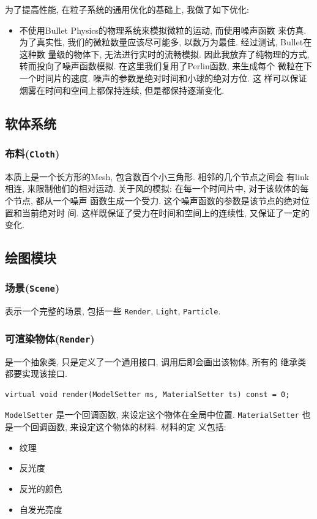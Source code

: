 \documentclass[11pt]{article}
\begin{document}
为了提高性能, 在粒子系统的通用优化的基础上, 我做了如下优化:
\begin{itemize}
\item 不使用Bullet Physics的物理系统来模拟微粒的运动, 而使用噪声函数
来仿真. 为了真实性, 我们的微粒数量应该尽可能多, 以数万为最佳. 经过测试, Bullet在这种数
量级的物体下, 无法进行实时的流畅模拟. 因此我放弃了纯物理的方式,
转而投向了噪声函数模拟. 在这里我们复用了Perlin函数, 来生成每个
微粒在下一个时间片的速度. 噪声的参数是绝对时间和小球的绝对方位. 这
样可以保证烟雾在时间和空间上都保持连续, 但是都保持逐渐变化.
\end{itemize}
\subsection{软体系统}
\label{sec-3-3}
\subsubsection{布料(\texttt{Cloth})}
\label{sec-3-3-1}
本质上是一个长方形的Mesh, 包含数百个小三角形. 相邻的几个节点之间会
有link相连, 来限制他们的相对运动. 
关于风的模拟: 在每一个时间片中, 对于该软体的每个节点, 都从一个噪声
函数生成一个受力. 这个噪声函数的参数是该节点的绝对位置和当前绝对时
间. 这样既保证了受力在时间和空间上的连续性, 又保证了一定的变化.
\subsection{绘图模块}
\label{sec-3-4}
\subsubsection{场景(\texttt{Scene})}
\label{sec-3-4-1}
表示一个完整的场景, 包括一些 \texttt{Render}, \texttt{Light}, \texttt{Particle}.
\subsubsection{可渲染物体(\texttt{Render})}
\label{sec-3-4-2}
是一个抽象类, 只是定义了一个通用接口, 调用后即会画出该物体, 所有的
继承类都要实现该接口. 
\begin{verbatim}
virtual void render(ModelSetter ms, MaterialSetter ts) const = 0;
\end{verbatim}
\texttt{ModelSetter} 是一个回调函数, 来设定这个物体在全局中位置.
\texttt{MaterialSetter} 也是一个回调函数, 来设定这个物体的材料. 材料的定
义包括:
\begin{itemize}
\item 纹理
\item 反光度
\item 反光的颜色
\item 自发光亮度
\end{itemize}
\end{document}
